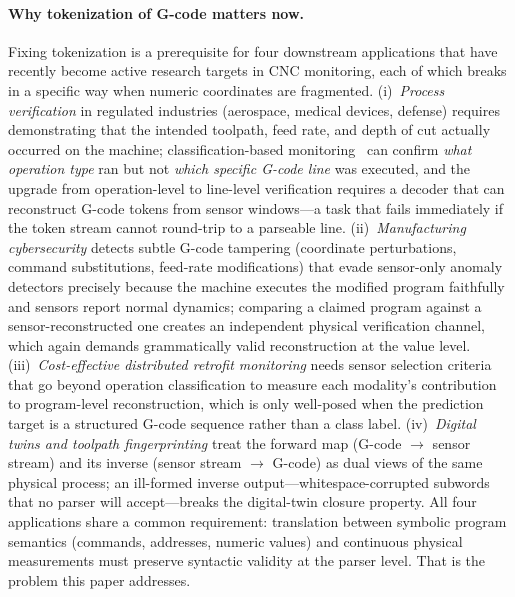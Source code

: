 \documentclass[11pt]{article}
\begin{document}
\paragraph{Why tokenization of G-code matters now.}
Fixing tokenization is a prerequisite for four downstream applications that have recently become active research targets in CNC monitoring, each of which breaks in a specific way when numeric coordinates are fragmented. (i)~\emph{Process verification} in regulated industries (aerospace, medical devices, defense) requires demonstrating that the intended toolpath, feed rate, and depth of cut actually occurred on the machine; classification-based monitoring~\cite{cnc_anomaly,tool_wear,vibration} can confirm \emph{what operation type} ran but not \emph{which specific G-code line} was executed, and the upgrade from operation-level to line-level verification requires a decoder that can reconstruct G-code tokens from sensor windows---a task that fails immediately if the token stream cannot round-trip to a parseable line. (ii)~\emph{Manufacturing cybersecurity} detects subtle G-code tampering (coordinate perturbations, command substitutions, feed-rate modifications) that evade sensor-only anomaly detectors precisely because the machine executes the modified program faithfully and sensors report normal dynamics; comparing a claimed program against a sensor-reconstructed one creates an independent physical verification channel, which again demands grammatically valid reconstruction at the value level. (iii)~\emph{Cost-effective distributed retrofit monitoring} needs sensor selection criteria that go beyond operation classification to measure each modality's contribution to program-level reconstruction, which is only well-posed when the prediction target is a structured G-code sequence rather than a class label. (iv)~\emph{Digital twins and toolpath fingerprinting} treat the forward map (G-code $\to$ sensor stream) and its inverse (sensor stream $\to$ G-code) as dual views of the same physical process; an ill-formed inverse output---whitespace-corrupted subwords that no parser will accept---breaks the digital-twin closure property. All four applications share a common requirement: translation between symbolic program semantics (commands, addresses, numeric values) and continuous physical measurements must preserve syntactic validity at the parser level. That is the problem this paper addresses.
\end{document}
